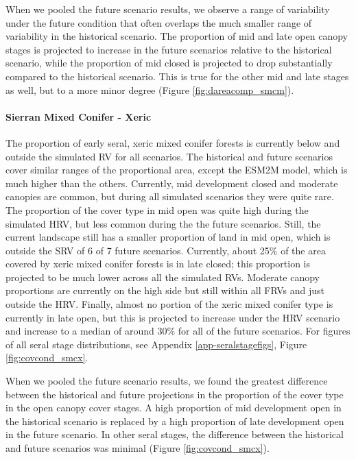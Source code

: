 \documentclass[12pt]{article}
\begin{document}
\begin{spacing}{1}
When we pooled the future scenario results, we observe a range of variability under the future condition that often overlaps the much smaller range of variability in the historical scenario. The proportion of mid and late open canopy stages is projected to increase in the future scenarios relative to the historical scenario, while the proportion of mid closed is projected to drop substantially compared to the historical scenario. This is true for the other mid and late stages as well, but to a more minor degree (Figure \ref{fig:dareacomp_smcm}).

\paragraph{Sierran Mixed Conifer - Xeric} The proportion of early seral, xeric mixed conifer forests is currently below and outside the simulated RV for all scenarios. The historical and future scenarios cover similar ranges of the proportional area, except the ESM2M model, which is much higher than the others. Currently, mid development closed and moderate canopies are common, but during all simulated scenarios they were quite rare. The proportion of the cover type in mid open was quite high during the simulated HRV, but less common during the the future scenarios. Still, the current landscape still has a smaller proportion of land in mid open, which is outside the SRV of 6 of 7 future scenarios. Currently, about 25\% of the area covered by xeric mixed conifer forests is in late closed; this proportion is projected to be much lower across all the simulated RVs. Moderate canopy proportions are currently on the high side but still within all FRVs and just outside the HRV. Finally, almost no portion of the xeric mixed conifer type is currently in late open, but this is projected to increase under the HRV scenario and increase to a median of around 30\% for all of the future scenarios. For figures of all seral stage distributions, see Appendix \ref{app-seralstagefigs}, Figure \ref{fig:covcond_smcx}.

When we pooled the future scenario results, we found the greatest difference between the historical and future projections in the proportion of the cover type in the open canopy cover stages. A high proportion of mid development open in the historical scenario is replaced by a high proportion of late development open in the future scenario. In other seral stages, the difference between the historical and future scenarios was minimal (Figure \ref{fig:covcond_smcx}).


\end{spacing}
\end{document}
